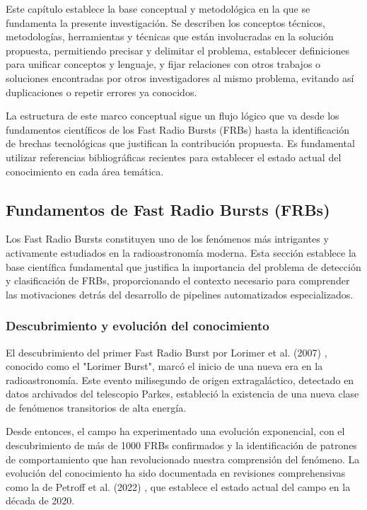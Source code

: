 
Este capítulo establece la base conceptual y metodológica en la que se fundamenta la presente investigación. Se describen los conceptos técnicos, metodologías, herramientas y técnicas que están involucradas en la solución propuesta, permitiendo precisar y delimitar el problema, establecer definiciones para unificar conceptos y lenguaje, y fijar relaciones con otros trabajos o soluciones encontradas por otros investigadores al mismo problema, evitando así duplicaciones o repetir errores ya conocidos.

La estructura de este marco conceptual sigue un flujo lógico que va desde los fundamentos científicos de los Fast Radio Bursts (FRBs) hasta la identificación de brechas tecnológicas que justifican la contribución propuesta. Es fundamental utilizar referencias bibliográficas recientes para establecer el estado actual del conocimiento en cada área temática.

\subsection{Fundamentos de Fast Radio Bursts (FRBs)}

Los Fast Radio Bursts constituyen uno de los fenómenos más intrigantes y activamente estudiados en la radioastronomía moderna. Esta sección establece la base científica fundamental que justifica la importancia del problema de detección y clasificación de FRBs, proporcionando el contexto necesario para comprender las motivaciones detrás del desarrollo de pipelines automatizados especializados.

\subsubsection{Descubrimiento y evolución del conocimiento}

El descubrimiento del primer Fast Radio Burst por Lorimer et al. (2007) \cite{Lorimer_2007}, conocido como el "Lorimer Burst", marcó el inicio de una nueva era en la radioastronomía. Este evento milisegundo de origen extragaláctico, detectado en datos archivados del telescopio Parkes, estableció la existencia de una nueva clase de fenómenos transitorios de alta energía.

Desde entonces, el campo ha experimentado una evolución exponencial, con el descubrimiento de más de 1000 FRBs confirmados y la identificación de patrones de comportamiento que han revolucionado nuestra comprensión del fenómeno. La evolución del conocimiento ha sido documentada en revisiones comprehensivas como la de Petroff et al. (2022) \cite{Petroff_2022}, que establece el estado actual del campo en la década de 2020.

